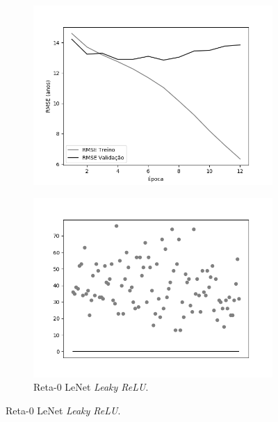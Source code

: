 \begin{figure}[hb!]
\begin{subfigure}[hb]{0.5\linewidth}
	    \includegraphics[width=\linewidth]{img/graficos/history/lenet/fig-history-image-treat-1-lenet-lrelu-rmse.png}
	  \end{subfigure}
		\begin{subfigure}[hb]{0.5\linewidth}
			\caption{Reta-0 LeNet \emph{Leaky ReLU}.}

		 \includegraphics[width=\linewidth]{img/graficos/reta0/lenet/fig-reta-0-image-treat-1-lenet-lrelu.png}
		\end{subfigure}%
	\end{figure}

